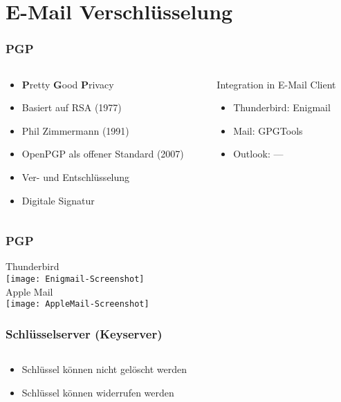 \section{E-Mail Verschlüsselung}


\begin{frame}
  \frametitle{PGP}
  \begin{columns}[c]
    \begin{column}{0.5\textwidth}
      \begin{itemize}
	\item \textbf{P}retty \textbf{G}ood \textbf{P}rivacy
	\item Basiert auf RSA (1977)
        \item Phil Zimmermann (1991)
        \item OpenPGP als offener Standard (2007)
        \item Ver- und Entschlüsselung
        \item Digitale Signatur
      \end{itemize}
    \end{column}
    \begin{column}{0.5\textwidth}
          Integration in E-Mail Client
        \begin{itemize}
          \item Thunderbird: Enigmail
          \item Mail: GPGTools
          \item Outlook: ---
        \end{itemize}
    \end{column}
  \end{columns}

\end{frame}

\begin{frame}
  \frametitle{PGP}
  \center
   Thunderbird\\[0.2em]
   \texttt{[image: Enigmail-Screenshot]}\\[0.7em]
   Apple Mail\\[0.2em]
   \texttt{[image: AppleMail-Screenshot]}
\end{frame}

\begin{frame}
  \frametitle{Schlüsselserver (Keyserver)}
  \begin{columns}[c]
    \begin{column}{0.5\textwidth}
      \begin{itemize}
       \item Schlüssel können nicht gelöscht werden
       \item Schlüssel können widerrufen werden
      \end{itemize}

    \end{column}
    \begin{column}{0.5\textwidth}
      \center {}
    \end{column}
  \end{columns}
\end{frame}

